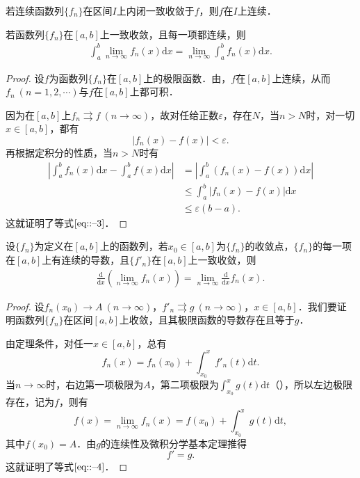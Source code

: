 \documentclass[../../main.tex]{subfiles}
\begin{document}
\begin{corollary}
若连续函数列\(\{f_n\}\)在区间\(I\)上内闭一致收敛于\(f\)，则\(f\)在\(I\)上连续．
\end{corollary}

\begin{theorem}[可积性]\label{theorem:定理13.15648640}
若函数列\(\{f_n\}\)在\([a, b]\)上一致收敛，且每一项都连续，则
\begin{align}
\int_a^b \lim_{n \to \infty} f_n(x) \mathrm{d}x = \lim_{n \to \infty} \int_a^b f_n(x) \mathrm{d}x. \label{eq::--3}
\end{align}
\end{theorem}
\begin{proof}
设\(f\)为函数列\(\{f_n\}\)在\([a, b]\)上的极限函数．由，\(f\)在\([a, b]\)上连续，从而\(f_n \ (n = 1, 2, \cdots)\)与\(f\)在\([a, b]\)上都可积．

因为在\([a, b]\)上\(f_n \rightrightarrows f \ (n \to \infty)\)，故对任给正数\(\varepsilon\)，存在\(N\)，当\(n > N\)时，对一切\(x \in [a, b]\)，都有
\[
|f_n(x) - f(x)| < \varepsilon.
\]
再根据定积分的性质，当\(n > N\)时有
\begin{align*}
\left| \int_a^b f_n(x) \mathrm{d}x - \int_a^b f(x) \mathrm{d}x \right| &= \left| \int_a^b (f_n(x) - f(x)) \mathrm{d}x \right| \\
&\leqslant \int_a^b |f_n(x) - f(x)| \mathrm{d}x \\
&\leqslant \varepsilon(b - a).
\end{align*}
这就证明了等式\(\eqref{eq::--3}\)．
\end{proof}

\begin{theorem}[可微性]\label{theorem:定理13.1154661}
设\(\{f_n\}\)为定义在\([a, b]\)上的函数列，若\(x_0 \in [a, b]\)为\(\{f_n\}\)的收敛点，\(\{f_n\}\)的每一项在\([a, b]\)上有连续的导数，且\(\{f'_n\}\)在\([a, b]\)上一致收敛，则
\begin{align}
\frac{\mathrm{d}}{\mathrm{d}x} \left( \lim_{n \to \infty} f_n(x) \right) = \lim_{n \to \infty} \frac{\mathrm{d}}{\mathrm{d}x} f_n(x). \label{eq::--4}
\end{align}
\end{theorem}
\begin{proof}
设\(f_n(x_0) \to A \ (n \to \infty)\)，\(f'_n \rightrightarrows g \ (n \to \infty)\)，\(x \in [a, b]\)．我们要证明函数列\(\{f_n\}\)在区间\([a, b]\)上收敛，且其极限函数的导数存在且等于\(g\)．

由定理条件，对任一\(x \in [a, b]\)，总有
\[
f_n(x) = f_n(x_0) + \int_{x_0}^x f'_n(t) \mathrm{d}t.
\]
当\(n \to \infty\)时，右边第一项极限为\(A\)，第二项极限为\(\int_{x_0}^x g(t) \mathrm{d}t\)（），所以左边极限存在，记为\(f\)，则有
\[
f(x) = \lim_{n \to \infty} f_n(x) = f(x_0) + \int_{x_0}^x g(t) \mathrm{d}t,
\]
其中\(f(x_0) = A\)．由\(g\)的连续性及微积分学基本定理推得
\[
f' = g.
\]
这就证明了等式\(\eqref{eq::--4}\)．
\end{proof}
\end{document}
